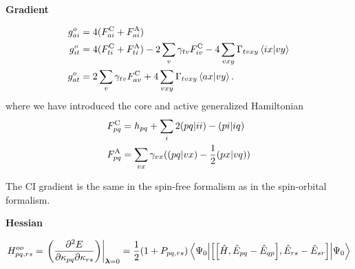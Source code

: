 \documentclass[11pt,a4paper]{article}
\newcommand{\hH}{\Hat{H}} %
\newcommand{\hE}{\Hat{E}} %
\newcommand{\FC}[1]{F_{#1}^{\text{C}}}
\newcommand{\FA}[1]{F_{#1}^{\text{A}}}
\newcommand{\ceri}[2]{\mleft(#1|#2\mright)}
\newcommand{\com}[2]{\mleft[#1,#2 \mright]}
\begin{document}
\noindent\textbf{Gradient}

\begin{subequations}
  \label{eq:MCSCF_O_Orb_Gradient}
  \begin{align}
    g^o_{ai} &= 4(\FC{ai} + \FA{ai}) \\
    g^o_{it} &= 4(\FC{ti} + \FA{ti}) - 2\sum_v \gamma_{tv}\FC{iv} -4\sum_{vxy}\Gamma_{tvxy}\braket{ix}{vy} \\
    g^o_{at} &= 2\sum_v \gamma_{tv}\FC{av} + 4\sum_{vxy}\Gamma_{tvxy}\braket{ax}{vy}.
  \end{align}
\end{subequations}
where we have introduced the core and active generalized Hamiltonian
\begin{align}
  \label{eq:MCSCF_GeneralizedFock}
  \FC{pq} &= h_{pq} + \sum_{i} 2\ceri{pq}{ii} - \ceri{pi}{iq} \\
  \FA{pq} &= \sum_{vx}\gamma_{vx}(\ceri{pq}{vx} - \frac{1}{2}\ceri{px}{vq})
\end{align}

The CI gradient is the same in the spin-free formalism as in the spin-orbital formalism.

\noindent\textbf{Hessian}

\begin{equation}
  \label{eq:MCSCF_O_OrbOrb_Hessian}
  H^{oo}_{pq,rs} = \evalat*{\mleft(\pdv{E}{\kappa_{pq}}{\kappa_{rs}}\mright)}{\bm{\lambda}=0} = \frac{1}{2}(1+P_{pq,rs})\mel**{\Psi_0}{\com{\com{\hH}{\hE_{pq} - \hE_{qp}}}{\hE_{rs} - \hE_{sr}}}{\Psi_0} 
\end{equation}
\end{document}
